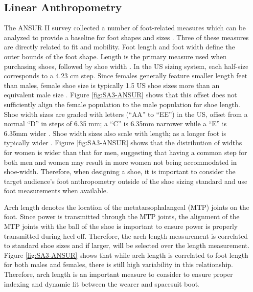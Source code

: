 \documentclass[defaultstyle,11pt]{thesis}
\begin{document}
\hypertarget{linear-anthropometry}{%
\subsection{Linear Anthropometry}\label{linear-anthropometry}}

The ANSUR II survey collected a number of foot-related measures which can be analyzed to provide a baseline for foot shapes and sizes \citep{Gordon2014}.
Three of these measures are directly related to fit and mobility.
Foot length and foot width define the outer bounds of the foot shape.
Length is the primary measure used when purchasing shoes, followed by shoe width \citep{Luximon2013}.
In the US sizing system, each half-size corresponds to a 4.23 cm step.
Since females generally feature smaller length feet than males, female shoe size is typically 1.5 US shoe sizes more than an equivalent male size \citep{Luximon2013}.
Figure \ref{fig:SA3-ANSUR} shows that this offset does not sufficiently align the female population to the male population for shoe length.
Shoe width sizes are graded with letters (``AA'' to ``EE'') in the US, offset from a normal ``D'' in steps of 6.35 mm; a ``C'' is 6.35mm narrower while a ``E'' is 6.35mm wider \citep{Luximon2013}.
Shoe width sizes also scale with length; as a longer foot is typically wider \citep{Jurca2019}.
Figure \ref{fig:SA3-ANSUR} shows that the distribution of widths for women is wider than that for men, suggesting that having a common step for both men and women may result in more women not being accommodated in shoe-width.
Therefore, when designing a shoe, it is important to consider the target audience's foot anthropometry outside of the shoe sizing standard and use foot measurements when available.

Arch length denotes the location of the metatarsophalangeal (MTP) joints on the foot.
Since power is transmitted through the MTP joints, the alignment of the MTP joints with the ball of the shoe is important to ensure power is properly transmitted during heel-off.
Therefore, the arch length measurement is correlated to standard shoe sizes and if larger, will be selected over the length measurement.
Figure \ref{fig:SA3-ANSUR} shows that while arch length is correlated to foot length for both males and females, there is still high variability in this relationship.
Therefore, arch length is an important measure to consider to ensure proper indexing and dynamic fit between the wearer and spacesuit boot.
\end{document}
